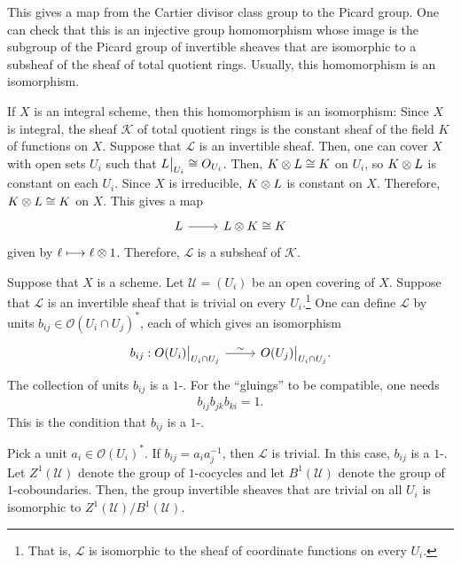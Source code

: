 \documentclass [11 pt, oneside] {article}
\begin{document}
This gives a map from the Cartier divisor class group to the Picard group. One can check that this is an injective group homomorphism whose image is the subgroup of the Picard group of invertible sheaves that are isomorphic to a subsheaf of the sheaf of total quotient rings. Usually, this homomorphism is an isomorphism. 

If $X$ is an integral scheme, then this homomorphism is an isomorphism: Since $X$ is integral, the sheaf $\mathscr{K}$ of total quotient rings is the constant sheaf of the field $K$ of functions on $X$. Suppose that $\mathscr{L}$ is an invertible sheaf. Then, one can cover $X$ with open sets $U_i$ such that $\relax{L}\big|_{U_i}\cong \relax{O}_{U_i}$. Then, $\relax{K}\otimes \relax{L}\cong \relax{K}$ on $U_i$, so $\relax{K}\otimes \relax{L}$ is constant on each $U_i$. Since $X$ is irreducible, $\relax{K}\otimes \relax{L}$ is constant on $X$. Therefore, $\relax{K}\otimes \relax{L}\cong \relax{K}$ on $X$. This gives a map
\[
\begin{tikzcd}
	\mathscr{L}\ar[r] & \mathscr{L}\tensor \mathscr{K}\isomto \mathscr{K}
\end{tikzcd}
\]
given by $\ell \longmapsto \ell\otimes 1$. Therefore, $\mathscr{L}$ is a subsheaf of $\mathscr{K}$.

Suppose that $X$ is a scheme. Let $\mathscr{U} = (U_i)$ be an open covering of $X$. Suppose that $\mathscr{L}$ is an invertible sheaf that is trivial on every $U_i$.\footnote{That is, $\mathscr{L}$ is isomorphic to the sheaf of coordinate functions on every $U_i$.} One can define $\mathscr{L}$ by units $b_{ij}\in \mathscr{O}(U_i\cap U_j) ^*$, each of which gives an isomorphism
\[
\begin{tikzcd}
	b_{ij}: \mathscr{O}(U_i) \big|_{U_i\cap U_j} \ar[r,"\sim"]& \mathscr{O}(U_j) \big|_{U_i\cap U_j}.
\end{tikzcd}
\]
The collection of units $b_{ij}$ is a $1$-. For the ``gluings'' to be compatible, one needs
\begin{align*}
	b_{ij}b_{jk}b_{ki} = 1.
\end{align*}
This is the condition that $b_{ij}$ is a $1$-.

Pick a unit $a_i\in \mathscr{O}(U_i) ^*$. If $b_{ij}=a_ia_j^{-1}$, then $\mathscr{L}$ is trivial. In this case, $b_{ij}$ is a $1$-. Let $Z^1(\mathscr{U})$ denote the group of $1$-cocycles and let $B^1(\mathscr{U})$ denote the group of $1$-coboundaries. Then, the group invertible sheaves that are trivial on all $U_i$ is isomorphic to $Z^1(\mathscr{U})/B^1(\mathscr{U})$. 
\end{document}
